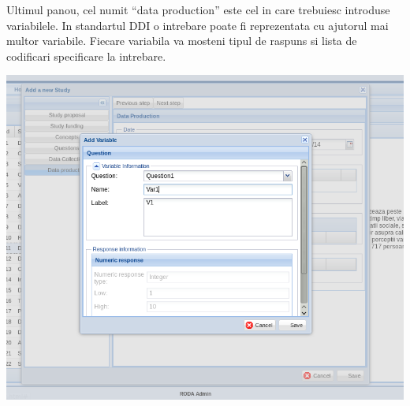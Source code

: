 Ultimul panou, cel numit “data production” este cel in care trebuiesc introduse variabilele. In standartul DDI o intrebare poate fi reprezentata cu ajutorul mai multor variabile. Fiecare variabila va mosteni tipul de raspuns si lista de codificari specificare la intrebare. 

\includegraphics[width=16cm]{img/ddi-editor-addvariable}



